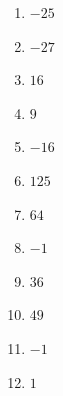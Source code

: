 %
%
    \begin{enumerate}[cols=4]
        \item \(-25\)
        \item \(-27\)
        \item \(16\)
        \item \(9\)
        \item \(-16\)
        \item \(125\)
        \item \(64\)
        \item \(-1\)
        \item \(36\)
        \item \(49\)
        \item \(-1\)
        \item \(1\)
    \end{enumerate}
